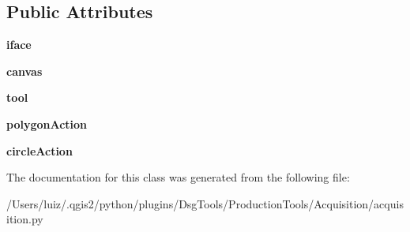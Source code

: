 \subsection*{Public Attributes}
\begin{DoxyCompactItemize}
\item 
\mbox{\label{class_dsg_tools_1_1_production_tools_1_1_acquisition_1_1acquisition_1_1_acquisition_aca93a61f967f85a96a0393fb91d66e34}} 
{\bfseries iface}
\item 
\mbox{\label{class_dsg_tools_1_1_production_tools_1_1_acquisition_1_1acquisition_1_1_acquisition_ab25aa60516ef49f53cdaf9097d92c6fa}} 
{\bfseries canvas}
\item 
\mbox{\label{class_dsg_tools_1_1_production_tools_1_1_acquisition_1_1acquisition_1_1_acquisition_aad81a16a950d2ef846e640f70b34f3a7}} 
{\bfseries tool}
\item 
\mbox{\label{class_dsg_tools_1_1_production_tools_1_1_acquisition_1_1acquisition_1_1_acquisition_a8ef5466e5a61b3d125302e5c500ac62b}} 
{\bfseries polygon\+Action}
\item 
\mbox{\label{class_dsg_tools_1_1_production_tools_1_1_acquisition_1_1acquisition_1_1_acquisition_a41ff9bf135f90bc88c3084a0f385b778}} 
{\bfseries circle\+Action}
\end{DoxyCompactItemize}


The documentation for this class was generated from the following file\+:\begin{DoxyCompactItemize}
\item 
/\+Users/luiz/.\+qgis2/python/plugins/\+Dsg\+Tools/\+Production\+Tools/\+Acquisition/acquisition.\+py\end{DoxyCompactItemize}
